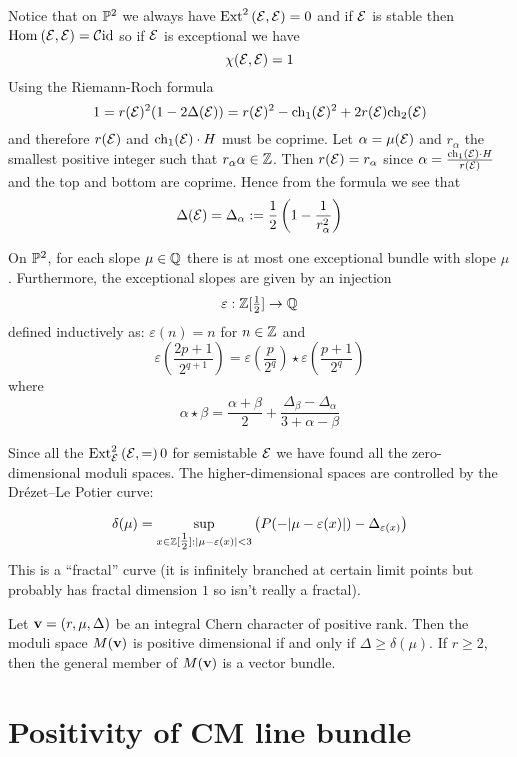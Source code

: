 \documentclass[12pt]{article}
\begin{document}
Notice that on $\P^2$ we always have $\Ext{2}{}{\E}{\E} = 0$ and if $\E$ is stable then $\Hom{}{\E}{\E} = \C \id$ so if $\E$ is exceptional we have
\[ \chi(\E, \E) = 1 \]
Using the Riemann-Roch formula
\[ 1 = r(\E)^2 (1 - 2 \Delta(\E)) = r(\E)^2 - \ch_1(\E)^2 + 2 r(\E) \ch_2(\E) \]
and therefore $r(\E)$ and $\ch_1(\E) \cdot H$ must be coprime. Let $\alpha = \mu(\E)$ and $r_\alpha$ the smallest positive integer such that $r_\alpha \alpha \in \Z$. Then $r(\E) = r_\alpha$ since $\alpha = \frac{\ch_1(\E) \cdot H}{r(\E)}$ and the top and bottom are coprime. Hence from the formula we see that
\[ \Delta(\E) = \Delta_\alpha := \frac{1}{2} \left( 1 - \frac{1}{r_{\alpha}^2} \right) \]

\begin{theorem}[Dre87]
On $\P^2$, for each slope $\mu \in \Q$ there is at most one exceptional bundle with slope $\mu$. Furthermore, the exceptional slopes are given by an injection
\[ \varepsilon : \Z[\tfrac{1}{2}] \to \Q \]
defined inductively as: $\varepsilon(n) = n$ for $n \in \ZZ$ and
\[ \varepsilon\left( \frac{2 p + 1}{2^{q+1}} \right) = \varepsilon \left( \frac{p}{2^q} \right) \star \varepsilon \left( \frac{p+1}{2^q} \right) \]
where
\[ \alpha \star \beta = \frac{\alpha + \beta}{2} + \frac{\Delta_\beta - \Delta_\alpha}{3 + \alpha - \beta} \]
\end{theorem}

Since all the $\Ext{2}{\E}{\E} = 0$ for semistable $\E$ we have found all the zero-dimensional moduli spaces. The higher-dimensional spaces are controlled by the Dr\'{e}zet--Le Potier curve:

\[ \delta(\mu) = \sup_{x \in \Z[\tfrac{1}{2}] : |\mu - \varepsilon(x)| < 3} \big( P(-|\mu - \varepsilon(x)|) - \Delta_{\varepsilon(x)} \big) \]
This is a ``fractal'' curve (it is infinitely branched at certain limit points but probably has fractal dimension $1$ so isn't really a fractal).

\begin{theorem}
Let $\bf{v} = (r, \mu, \Delta)$ be an integral Chern character of positive rank. Then the moduli space $M(\bf{v})$ is positive dimensional if and only if $\Delta \ge \delta(\mu)$. If $r \ge 2$, then the general member of $M(\bf{v})$ is a vector bundle.
\end{theorem}

\section{Positivity of CM line bundle}
\end{document}
